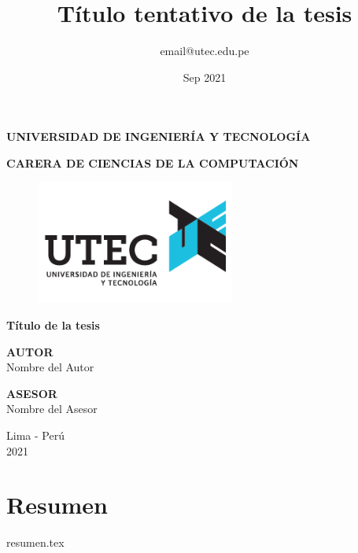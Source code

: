 \documentclass{report}
\title{Título tentativo de la tesis}
\author{email@utec.edu.pe}
\date{Sep 2021}
\begin{document}
\begin{titlepage}
    \begin{center}
        \Large
        \textbf{UNIVERSIDAD DE INGENIERÍA Y TECNOLOGÍA}
        \vspace*{1cm}
        
        \large
        \textbf{CARERA DE CIENCIAS DE LA COMPUTACIÓN}
        \vspace*{1cm}
        
        \begin{figure}[htbp]
            \centering
            \includegraphics[width=6.5cm,height=\textheight,keepaspectratio]{images/logo}
        \end{figure}

            
        \LARGE
        \textbf{Título de la tesis}
            
        \vspace{1.0cm}
        \Large
        
            
        \textbf{AUTOR}
        \vspace{0.5cm}
        \\Nombre del Autor
        \vfill
        
        \vspace{1.0cm}
        
        \textbf{ASESOR}
        \vspace{0.5cm}
        \\Nombre del Asesor
        \vfill
        \vspace{0.8cm}
        \Large
        
        Lima - Perú
        \\
        2021
            
    \end{center}
\end{titlepage}


\chapter*{Resumen}
{resumen.tex}
\end{document}

